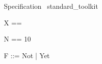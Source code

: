 
\begin{zsection}
	 \SECTION Specification \parents~standard\_toolkit
\end{zsection}

 \begin{zed}
X == \power \nat
\end{zed}

 \begin{zed}
N == 10
\end{zed}

 \begin{zed}
F ::= Not | Yet \ldata \nat \rdata
\end{zed}

 

